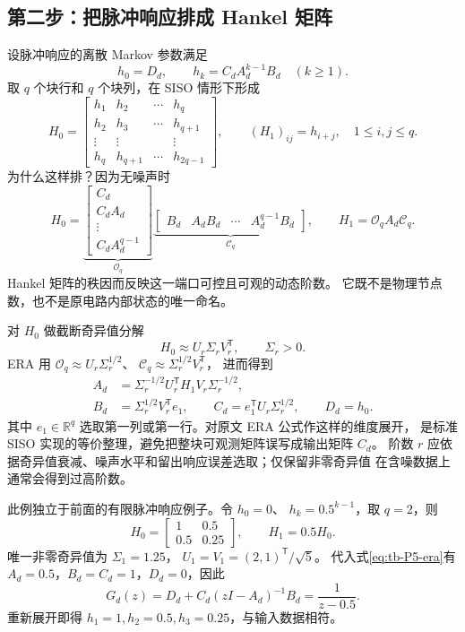 \subsection{第二步：把脉冲响应排成 Hankel 矩阵}
设脉冲响应的离散 Markov 参数满足
\[
 h_0=D_d,\qquad h_k=C_dA_d^{k-1}B_d\quad(k\ge1).
\]
取 $q$ 个块行和 $q$ 个块列，在 SISO 情形下形成
\[
 H_0=
 \begin{bmatrix}
 h_1&h_2&\cdots&h_q\\
 h_2&h_3&\cdots&h_{q+1}\\
 \vdots&\vdots&&\vdots\\
 h_q&h_{q+1}&\cdots&h_{2q-1}
 \end{bmatrix},\qquad
 (H_1)_{ij}=h_{i+j},\quad1\le i,j\le q .
\]
为什么这样排？因为无噪声时
\[
 H_0=\underbrace{\begin{bmatrix}C_d\\C_dA_d\\\vdots\\C_dA_d^{q-1}\end{bmatrix}}_{\mathcal O_q}
 \underbrace{\begin{bmatrix}B_d&A_dB_d&\cdots&A_d^{q-1}B_d\end{bmatrix}}_{\mathcal C_q},
 \qquad H_1=\mathcal O_q A_d\mathcal C_q.
\]
Hankel 矩阵的秩因而反映这一端口可控且可观的动态阶数。
它既不是物理节点数，也不是原电路内部状态的唯一命名。

对 $H_0$ 做截断奇异值分解
\[
 H_0\approx U_r\Sigma_rV_r^\mathsf T,\qquad \Sigma_r>0.
\]
ERA 用 $\mathcal O_q\approx U_r\Sigma_r^{1/2}$、
$\mathcal C_q\approx\Sigma_r^{1/2}V_r^\mathsf T$，
进而得到
\begin{equation}\label{eq:tb-P5-era}
 \begin{split}
 A_d&=\Sigma_r^{-1/2}U_r^\mathsf T H_1V_r\Sigma_r^{-1/2},\\
 B_d&=\Sigma_r^{1/2}V_r^\mathsf T e_1,\qquad
 C_d=e_1^\mathsf T U_r\Sigma_r^{1/2},\qquad D_d=h_0.
 \end{split}
\end{equation}
其中 $e_1\in\mathbb R^q$ 选取第一列或第一行。对原文 ERA 公式作这样的维度展开，
是标准 SISO 实现的等价整理，避免把整块可观测矩阵误写成输出矩阵 $C_d$。
阶数 $r$ 应依据奇异值衰减、噪声水平和留出响应误差选取；仅保留非零奇异值
在含噪数据上通常会得到过高阶数。

\begin{example}
此例独立于前面的有限脉冲响应例子。令 $h_0=0$、
$h_k=0.5^{k-1}$，取 $q=2$，则
\[
 H_0=\begin{bmatrix}1&0.5\\0.5&0.25\end{bmatrix},\qquad H_1=0.5H_0.
\]
唯一非零奇异值为 $\Sigma_1=1.25$，
$U_1=V_1=(2,1)^\mathsf T/\sqrt5$。
代入式\eqref{eq:tb-P5-era}有
$A_d=0.5$，$B_d=C_d=1$，$D_d=0$，因此
\[
 G_d(z)=D_d+C_d(zI-A_d)^{-1}B_d=\frac1{z-0.5}.
\]
重新展开即得 $h_1=1,h_2=0.5,h_3=0.25$，与输入数据相符。
\end{example}

